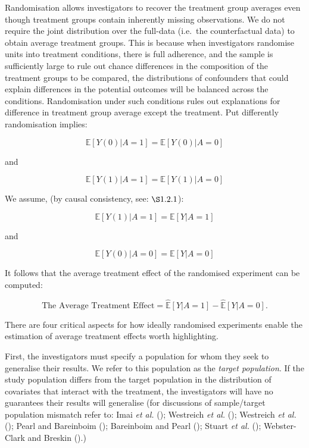 \documentclass[
  single column]{article}
\begin{document}
Randomisation allows investigators to recover the treatment group
averages even though treatment groups contain inherently missing
observations. We do not require the joint distribution over the
full-data (i.e.~the counterfactual data) to obtain average treatment
groups. This is because when investigators randomise units into
treatment conditions, there is full adherence, and the sample is
sufficiently large to rule out chance differences in the composition of
the treatment groups to be compared, the distributions of confounders
that could explain differences in the potential outcomes will be
balanced across the conditions. Randomisation under such conditions
rules out explanations for difference in treatment group average except
the treatment. Put differently randomisation implies:

\[
\mathbb{E}[Y(0) | A = 1] = \mathbb{E}[Y(0) | A = 0]
\]

and

\[
\mathbb{E}[Y(1) | A = 1] = \mathbb{E}[Y(1) | A = 0]
\]

We assume, (by causal consistency, see: \(\S 1.2.1\)):

\[ \mathbb{E}[Y(1) | A = 1] = \mathbb{E}[Y| A = 1]\]

and

\[\mathbb{E}[Y(0) | A = 0] = \mathbb{E}[Y| A = 0]\]

It follows that the average treatment effect of the randomised
experiment can be computed:

\[
\text{The Average Treatment Effect} = \widehat{\mathbb{E}}[Y | A = 1] - \widehat{\mathbb{E}}[Y | A = 0].
\]

There are four critical aspects for how ideally randomised experiments
enable the estimation of average treatment effects worth highlighting.

First, the investigators must specify a population for whom they seek to
generalise their results. We refer to this population as the
\emph{target population}. If the study population differs from the
target population in the distribution of covariates that interact with
the treatment, the investigators will have no guarantees their results
will generalise (for discussions of sample/target population mismatch
refer to: Imai \emph{et al.}
(); Westreich \emph{et
al.} (); Westreich \emph{et al.}
(); Pearl and Bareinboim
(); Bareinboim and Pearl
(); Stuart \emph{et al.}
(); Webster-Clark and
Breskin ().)
\end{document}

